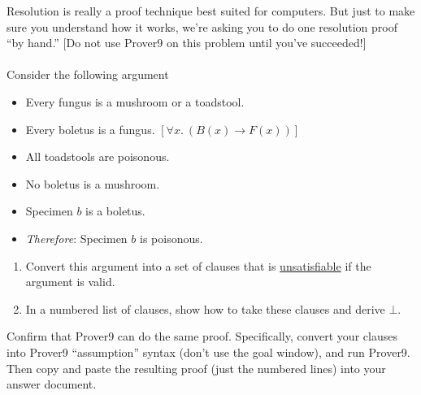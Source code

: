 \documentclass[12pt,letterpaper,boxed,cm]{hmcpset}
\newcommand{\ra}[0]{\rightarrow}
\begin{document}

\begin{problem}[1.]
    [10 points] Resolution is really a proof technique best suited for computers. But just to make sure you understand how it works, we're asking you to do one resolution proof ``by hand.'' [Do not use Prover9 on this problem until you've succeeded!]\\\\
    Consider the following argument
    \begin{itemize}
        \item Every fungus is a mushroom or a toadstool.                  
        \item Every boletus is a fungus. \hspace{6cm} $[\forall x.\ (B(x)\ra F(x))]$
        \item All toadstools are poisonous.
        \item No boletus is a mushroom.
        \item Specimen $b$ is a boletus.
        \item \emph{Therefore}: Specimen $b$ is poisonous.
    \end{itemize}
    \begin{enumerate}[label=\Alph*.]
        \item Convert this argument into a set of clauses that is \ul{unsatisfiable} if the argument is valid.
        \item In a numbered list of clauses, show how to take these clauses and derive $\bot$.
    \end{enumerate}
\end{problem}

\begin{solution}
    \vfill
\end{solution}
\newpage

\begin{problem}[2.]
    [5 points] Confirm that Prover9 can do the same proof. Specifically, convert your clauses into Prover9 ``assumption'' syntax (don’t use the goal window), and run Prover9. Then copy and paste the resulting proof (just the numbered lines) into your answer document.
\end{problem}

\begin{solution}
    \vfill
\end{solution}
\newpage
\end{document}
